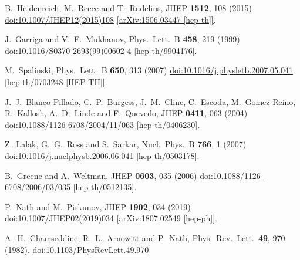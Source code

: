 \documentclass[12pt]{article}
\begin{document}
\begin{thebibliography}{99}
  B.~Heidenreich, M.~Reece and T.~Rudelius,
  JHEP {\bf 1512}, 108 (2015)
  \href{https://dx.doi.org/10.1007/JHEP12(2015)108}{doi:10.1007/JHEP12(2015)108}
  \href{https://arxiv.org/abs/1506.03447}{[arXiv:1506.03447 [hep-th]]}.

  J.~Garriga and V.~F.~Mukhanov,
  Phys.\ Lett.\ B {\bf 458}, 219 (1999)
  \href{https://dx.doi.org/10.1016/S0370-2693(99)00602-4}{doi:10.1016/S0370-2693(99)00602-4}
  \href{https://arxiv.org/abs/hep-th/9904176}{[hep-th/9904176]}.

  M.~Spalinski,
  Phys.\ Lett.\ B {\bf 650}, 313 (2007)
  \href{https://dx.doi.org/10.1016/j.physletb.2007.05.041}{doi:10.1016/j.physletb.2007.05.041}
  \href{https://arxiv.org/abs/hep-th/0703248}{[hep-th/0703248 [HEP-TH]]}.

  J.~J.~Blanco-Pillado, C.~P.~Burgess, J.~M.~Cline, C.~Escoda, M.~Gomez-Reino, R.~Kallosh, A.~D.~Linde and F.~Quevedo,
  JHEP {\bf 0411}, 063 (2004)
  \href{https://dx.doi.org/10.1088/1126-6708/2004/11/063}{doi:10.1088/1126-6708/2004/11/063}
  \href{https://arxiv.org/abs/hep-th/0406230}{[hep-th/0406230]}.

  Z.~Lalak, G.~G.~Ross and S.~Sarkar,
  Nucl.\ Phys.\ B {\bf 766}, 1 (2007)
  \href{https://dx.doi.org/10.1016/j.nuclphysb.2006.06.041}{doi:10.1016/j.nuclphysb.2006.06.041}
  \href{https://arxiv.org/abs/hep-th/0503178}{[hep-th/0503178]}.

  B.~Greene and A.~Weltman,
  JHEP {\bf 0603}, 035 (2006)
  \href{https://dx.doi.org/10.1088/1126-6708/2006/03/035}{doi:10.1088/1126-6708/2006/03/035}
  \href{https://arxiv.org/abs/hep-th/0512135}{[hep-th/0512135]}.

  P.~Nath and M.~Piskunov,
  JHEP {\bf 1902}, 034 (2019)
  \href{https://dx.doi.org/10.1007/JHEP02(2019)034}{doi:10.1007/JHEP02(2019)034}
  \href{https://arxiv.org/abs/1807.02549}{[arXiv:1807.02549 [hep-ph]]}.

  A.~H.~Chamseddine, R.~L.~Arnowitt and P.~Nath,
  Phys.\ Rev.\ Lett.\  {\bf 49}, 970 (1982).
  \href{https://dx.doi.org/10.1103/PhysRevLett.49.970}{doi:10.1103/PhysRevLett.49.970}


\end{thebibliography}
\end{document}
